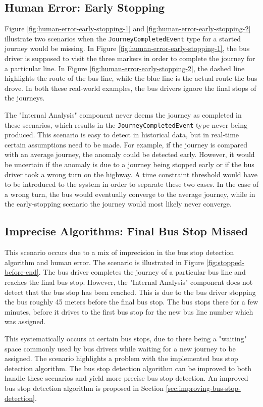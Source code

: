 \subsection{Human Error: Early Stopping}
Figure \ref{fig:human-error-early-stopping-1} and \ref{fig:human-error-early-stopping-2} illustrate two scenarios when the \texttt{JourneyCompletedEvent} type for a started journey would be missing.
In Figure \ref{fig:human-error-early-stopping-1}, the bus driver is supposed to visit the three markers in order to complete the journey for a particular line.
In Figure \ref{fig:human-error-early-stopping-2}, the dashed line highlights the route of the bus line, while the blue line is the actual route the bus drove.
In both these real-world examples, the bus drivers ignore the final stops of the journeys.

The "Internal Analysis" component never deems the journey as completed in these scenarios, which results in the \texttt{JourneyCompletedEvent} type never being produced.
This scenario is easy to detect in historical data, but in real-time certain assumptions need to be made.
For example, if the journey is compared with an average journey, the anomaly could be detected early.
However, it would be uncertain if the anomaly is due to a journey being stopped early or if the bus driver took a wrong turn on the highway.
A time constraint threshold would have to be introduced to the system in order to separate these two cases.
In the case of a wrong turn, the bus would eventually converge to the average journey, while in the early-stopping scenario the journey would most likely never converge.


\subsection{Imprecise Algorithms: Final Bus Stop Missed}
This scenario occurs due to a mix of imprecision in the bus stop detection algorithm and human error.
The scenario is illustrated in Figure \ref{fig:stopped-before-end}.
The bus driver completes the journey of a particular bus line and reaches the final bus stop.
However, the "Internal Analysis" component does not detect that the bus stop has been reached.
This is due to the bus driver stopping the bus roughly 45 meters before the final bus stop.
The bus stops there for a few minutes, before it drives to the first bus stop for the new bus line number which was assigned.

This systematically occurs at certain bus stops, due to there being a "waiting" space commonly used by bus drivers while waiting for a new journey to be assigned.
The scenario highlights a problem with the implemented bus stop detection algorithm.
The bus stop detection algorithm can be improved to both handle these scenarios and yield more precise bus stop detection.
An improved bus stop detection algorithm is proposed in Section \ref{sec:improving-bus-stop-detection}.

